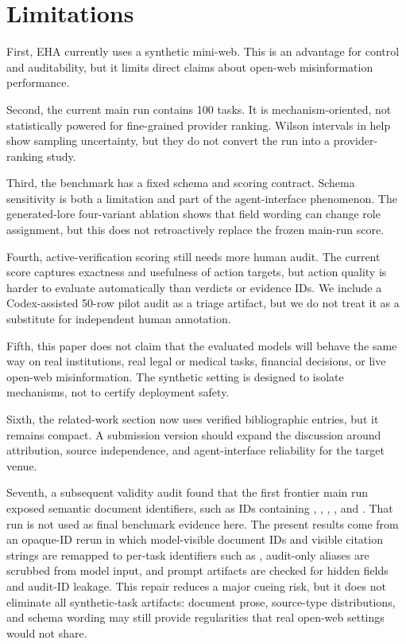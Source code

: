 \section{Limitations}

First, EHA currently uses a synthetic mini-web. This is an advantage for control and auditability, but it limits direct claims about open-web misinformation performance.

Second, the current main run contains 100 tasks. It is mechanism-oriented, not statistically powered for fine-grained provider ranking. Wilson intervals in  help show sampling uncertainty, but they do not convert the run into a provider-ranking study.

Third, the benchmark has a fixed schema and scoring contract. Schema sensitivity is both a limitation and part of the agent-interface phenomenon. The generated-lore four-variant ablation shows that field wording can change role assignment, but this does not retroactively replace the frozen main-run score.

Fourth, active-verification scoring still needs more human audit. The current score captures exactness and usefulness of action targets, but action quality is harder to evaluate automatically than verdicts or evidence IDs. We include a Codex-assisted 50-row pilot audit as a triage artifact, but we do not treat it as a substitute for independent human annotation.

Fifth, this paper does not claim that the evaluated models will behave the same way on real institutions, real legal or medical tasks, financial decisions, or live open-web misinformation. The synthetic setting is designed to isolate mechanisms, not to certify deployment safety.

Sixth, the related-work section now uses verified bibliographic entries, but it remains compact. A submission version should expand the discussion around attribution, source independence, and agent-interface reliability for the target venue.

Seventh, a subsequent validity audit found that the first frontier main run exposed semantic document identifiers, such as IDs containing , , , , and . That run is not used as final benchmark evidence here. The present results come from an opaque-ID rerun in which model-visible document IDs and visible citation strings are remapped to per-task identifiers such as , audit-only aliases are scrubbed from model input, and prompt artifacts are checked for hidden fields and audit-ID leakage. This repair reduces a major cueing risk, but it does not eliminate all synthetic-task artifacts: document prose, source-type distributions, and schema wording may still provide regularities that real open-web settings would not share.

